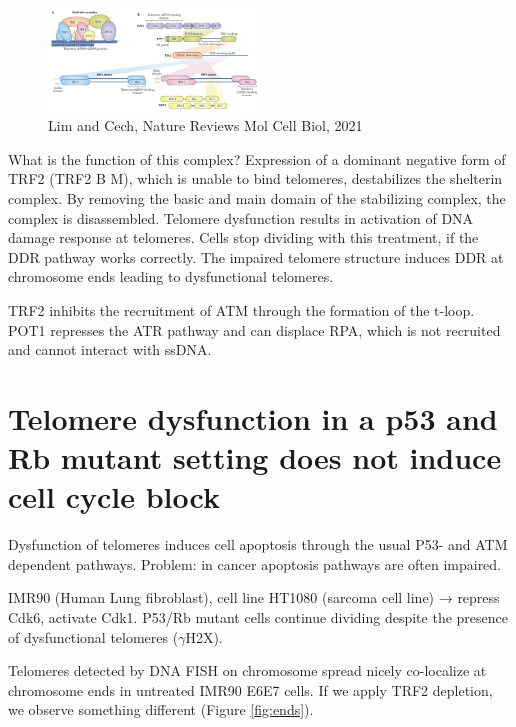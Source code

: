 \begin{figure}
\centering
\includegraphics[width=0.5\textwidth]{../_resources/Screen_Shot_2022-12-15_at_17-43-24.png}
\caption{Lim and Cech, Nature Reviews Mol Cell Biol, 2021}
\label{fig:shelt}
\end{figure}

What is the function of this complex? Expression of a dominant negative
form of TRF2 (TRF2 B M), which is unable to bind telomeres, destabilizes
the shelterin complex. By removing the basic and main domain of the
stabilizing complex, the complex is disassembled. Telomere dysfunction
results in activation of DNA damage response at telomeres. Cells stop
dividing with this treatment, if the DDR pathway works correctly. The
impaired telomere structure induces DDR at chromosome ends leading to
dysfunctional telomeres.

TRF2 inhibits the recruitment of ATM through the formation of the t-loop. POT1 represses the ATR pathway and can
displace RPA, which is not recruited and cannot interact with ssDNA.

\hypertarget{telomere-dysfunction-in-a-p53-and-rb-mutant-setting-does-not-induce-cell-cycle-block}{%
\section{Telomere dysfunction in a p53 and Rb mutant setting does not induce cell cycle block}\label{telomere-dysfunction-in-a-p53-and-rb-mutant-setting-does-not-induce-cell-cycle-block}}

Dysfunction of telomeres induces cell apoptosis through the usual P53-
and ATM dependent pathways. Problem: in cancer apoptosis pathways
are often impaired.

IMR90 (Human Lung fibroblast), cell line HT1080 (sarcoma cell line) →
repress Cdk6, activate Cdk1. P53/Rb mutant cells continue dividing
despite the presence of dysfunctional telomeres ($\gamma$H2X).

Telomeres detected by DNA FISH on chromosome spread nicely co-localize
at chromosome ends in untreated IMR90 E6E7 cells. If we apply TRF2
depletion, we observe something different (Figure \ref{fig:ends}).

